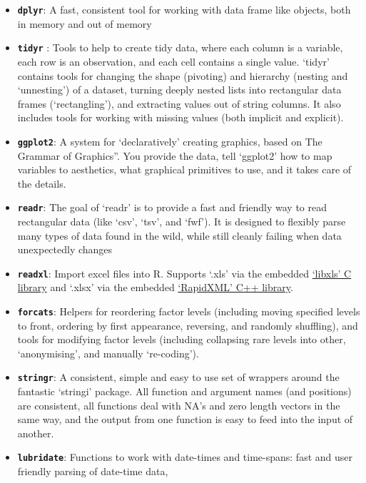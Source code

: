 \documentclass[
  letterpaper,
  DIV=11,
  numbers=noendperiod]{scrreprt}
\providecommand{\tightlist}{%
  \setlength{\itemsep}{0pt}\setlength{\parskip}{0pt}}\usepackage{longtable,booktabs,array}
\begin{document}
\begin{itemize}
\tightlist
\item
  \textbf{\texttt{dplyr}}: A fast, consistent tool for working with data
  frame like objects, both in memory and out of memory
\item
  \textbf{\texttt{tidyr}} : Tools to help to create tidy data, where
  each column is a variable, each row is an observation, and each cell
  contains a single value. `tidyr' contains tools for changing the shape
  (pivoting) and hierarchy (nesting and `unnesting') of a dataset,
  turning deeply nested lists into rectangular data frames
  (`rectangling'), and extracting values out of string columns. It also
  includes tools for working with missing values (both implicit and
  explicit).
\item
  \textbf{\texttt{ggplot2}}: A system for `declaratively' creating
  graphics, based on The Grammar of Graphics''. You provide the data,
  tell `ggplot2' how to map variables to aesthetics, what graphical
  primitives to use, and it takes care of the details.
\item
  \textbf{\texttt{readr}}: The goal of `readr' is to provide a fast and
  friendly way to read rectangular data (like `csv', `tsv', and `fwf').
  It is designed to flexibly parse many types of data found in the wild,
  while still cleanly failing when data unexpectedly changes
\item
  \textbf{\texttt{readxl}}: Import excel files into R. Supports `.xls'
  via the embedded \href{https://github.com/libxls/libxls}{`libxls' C
  library} and `.xlsx' via the embedded
  \href{https://rapidxml.sourceforge.net/}{`RapidXML' C++ library}.
\item
  \textbf{\texttt{forcats}}: Helpers for reordering factor levels
  (including moving specified levels to front, ordering by first
  appearance, reversing, and randomly shuffling), and tools for
  modifying factor levels (including collapsing rare levels into other,
  `anonymising', and manually `re-coding').
\item
  \textbf{\texttt{stringr}}: A consistent, simple and easy to use set of
  wrappers around the fantastic `stringi' package. All function and
  argument names (and positions) are consistent, all functions deal with
  NA's and zero length vectors in the same way, and the output from one
  function is easy to feed into the input of another.
\item
  \textbf{\texttt{lubridate}}: Functions to work with date-times and
  time-spans: fast and user friendly parsing of date-time data,

\end{itemize}
\end{document}
